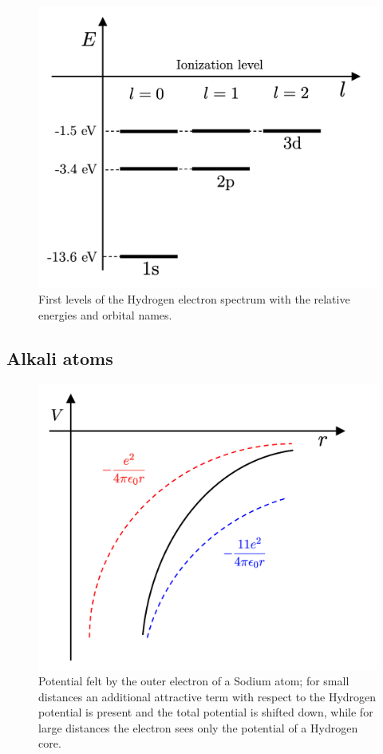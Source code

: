 \begin{figure}[h!]
\centering
    \includegraphics[width=0.5\linewidth]{images/Hydrogen_spectrum.png}
    \caption{First levels of the Hydrogen electron spectrum with the relative energies and orbital names.}
    \label{fig:hydro_spectrum}
\end{figure}

\subsection{Alkali atoms}

\begin{figure}[t]
\centering
    \includegraphics[width=0.58\linewidth]{images/Alkali_potential.png}
    \caption{Potential felt by the outer electron of a Sodium atom; for small distances an additional attractive term with respect to the Hydrogen potential is present and the total potential is shifted down, while for large distances the electron sees only the potential of a Hydrogen core.}
    \label{fig:pot_Alkali}
\end{figure}


